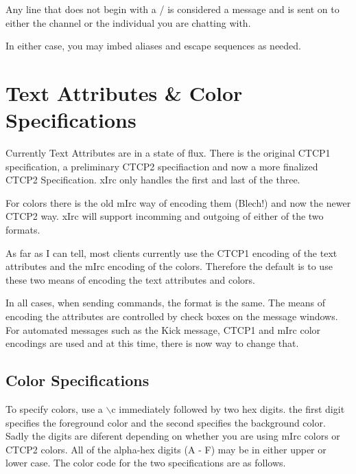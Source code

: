 \documentclass[titlepage]{article}
\begin{document}
Any line that does not begin with a / is considered a message and is
sent on to either the channel or the individual you are chatting with.

In either case, you may imbed aliases and escape sequences as needed.

\section{Text Attributes \& Color Specifications} \label{textattr}
Currently Text Attributes are in a state of flux. There is the original
CTCP1 specification, a preliminary CTCP2 specifiaction and now a more 
finalized CTCP2 Specification. xIrc only handles the first and last of 
the three.

For colors there is the old mIrc way of encoding them (Blech!) and now
the newer CTCP2 way. xIrc will support incomming and outgoing of either
of the two formats.

As far as I can tell, most clients currently use the CTCP1 encoding of the text
attributes and the mIrc encoding of the colors. Therefore the default is to
use these two means of encoding the text attributes and colors.

In all cases, when sending commands, the format is the same. The means
of encoding the attributes are controlled by check boxes on the message windows.
For automated messages such as the Kick message, CTCP1 and mIrc color encodings 
are used and at this time, there is now way to change that.

\subsection{Color Specifications}

To specify colors, use a $\backslash$c immediately followed by two hex digits.
the first digit specifies the foreground color and the second specifies the background
color. Sadly the digits are diferent depending on whether you are using mIrc colors or
CTCP2 colors. All of the alpha-hex digits (A - F) may be in either upper or lower case.
The color code for the two specifications are as follows.
\end{document}
